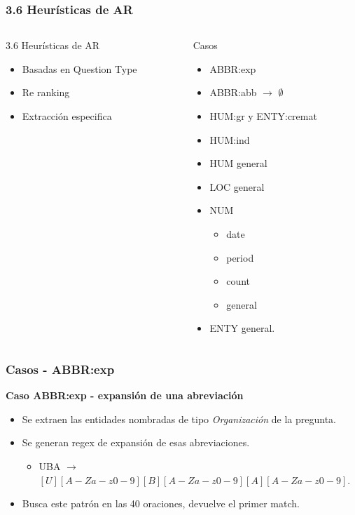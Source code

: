 \begin{frame}
  \frametitle{3.6 Heurísticas de AR}
\begin{columns}[T] %
\begin{column}{.48\textwidth}
    \begin{exampleblock}{3.6 Heurísticas de AR}
  \begin{itemize}
      \item Basadas en Question Type
      \item Re ranking
      \item Extracción especifica
  \end{itemize}
  \end{exampleblock}

\end{column}%
\hfill%
\begin{column}{.48\textwidth}

Casos
  \begin{itemize}
  \item ABBR:exp
  \item ABBR:abb $\rightarrow$ $\emptyset$
  \item HUM:gr y ENTY:cremat
  \item HUM:ind
  \item HUM general
  \item LOC general
  \item NUM
  \begin{itemize}
    \item date
    \item period
    \item count
    \item general
  \end{itemize}
  \item ENTY general.
\end{itemize}

\end{column}%
\end{columns}
\end{frame}




\begin{frame}
  \frametitle{Casos - ABBR:exp}
  \textbf{Caso ABBR:exp - expansión de una abreviación}\newline
  \begin{itemize}
    \item Se extraen las entidades nombradas de tipo \textit{Organización} de la pregunta. 
    \item Se generan regex de expansión de esas abreviaciones. 
    \begin{itemize}
       \item \tiny{UBA $\rightarrow$ $[U][A-Za-z0-9][B][A-Za-z0-9][A][A-Za-z0-9]$.}
    \end{itemize}    
    \item Busca este patrón en las 40 oraciones, devuelve el primer match. \newline
  \end{itemize}
\end{frame}


